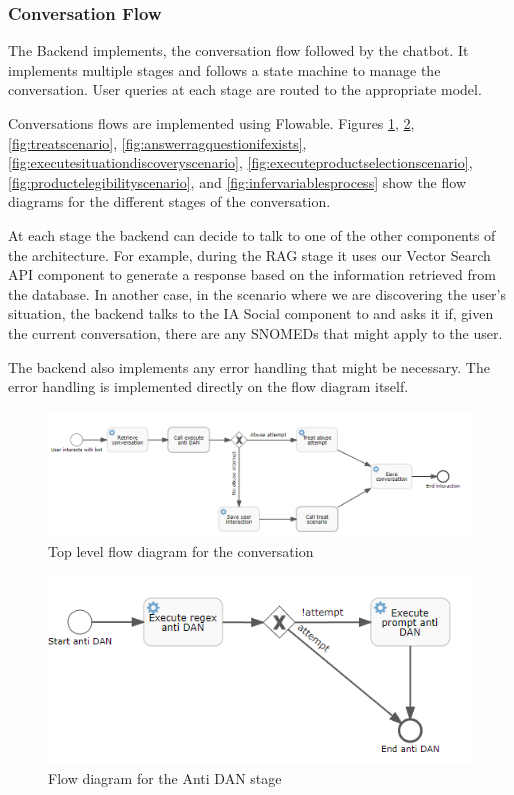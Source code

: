 \documentclass[a4paper,12pt,twoside]{ThesisStyle}
\begin{document}
\subsubsection{Conversation Flow}

The Backend implements, the conversation flow followed by the chatbot. It implements multiple stages and follows a state machine to manage the conversation. User queries at each stage are routed to the appropriate model.

Conversations flows are implemented using Flowable. Figures \ref{fig:conversation}, \ref{fig:antidan}, \ref{fig:treatscenario}, \ref{fig:answerragquestionifexists}, \ref{fig:executesituationdiscoveryscenario}, \ref{fig:executeproductselectionscenario}, \ref{fig:productelegibilityscenario}, and \ref{fig:infervariablesprocess} show the flow diagrams for the different stages of the conversation.

At each stage the backend can decide to talk to one of the other components of the architecture. For example, during the RAG stage it uses our Vector Search API component to generate a response based on the information retrieved from the database. In another case, in the scenario where we are discovering the user's situation, the backend talks to the IA Social component to and asks it if, given the current conversation, there are any SNOMEDs that might apply to the user.

The backend also implements any error handling that might be necessary. The error handling is implemented directly on the flow diagram itself.

\begin{figure}[htb]
  \label{fig:conversation}
  \centering
  \includegraphics[width=1\textwidth]{imatges/0_DsoConversation.png}
  \caption{Top level flow diagram for the conversation}
\end{figure}

\begin{figure}[htb]
  \centering
  \includegraphics[width=1\textwidth]{imatges/1_DsoExecuteAntiDAN.png}
  \caption{Flow diagram for the Anti DAN stage}
  \label{fig:antidan}
\end{figure}
\end{document}
